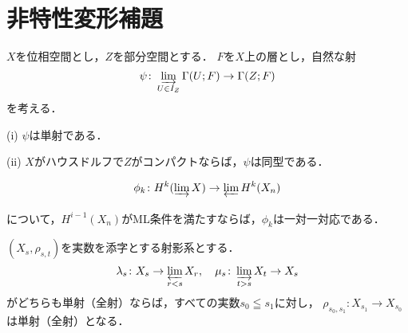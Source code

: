 \section{非特性変形補題}
\begin{leftbar}
\begin{PRP}[{\cite[Prop. 2.5.1]{KS90}}]\label{PRP2.5.1}
    \(X\)を位相空間とし，\(Z\)を部分空間とする．
    \(F\)を\(X\)上の層とし，自然な射
    \[
        \psi\colon\indlim[U\in I_Z]\Gamma(U;F)\to\Gamma(Z;F)
    \]を考える．

    (i) 
    \(\psi\)は単射である．

    (ii)
    \(X\)がハウスドルフで\(Z\)がコンパクトならば，\(\psi\)は同型である．
\end{PRP}
\end{leftbar}
\begin{leftbar}
    \begin{PRP}[{\cite[Prop. 1.12.4]{KS90}}]\label{PRP1.12.4}
        \[
            \phi_k\colon H^k(\indlim X)\to\prolim H^k(X_n)
        \]
        について，\(H^{i-1}(X_n)\)がML条件を満たすならば，\(\phi_k\)は一対一対応である．
    \end{PRP}
\end{leftbar}
    
\begin{leftbar}
\begin{PRP}[{\cite[Prop. 1.12.6]{KS90}}]\label{PRP1.12.6}
    \((X_s,\rho_{s,t})\)を実数を添字とする射影系とする．
    \[
        \lambda_s\colon X_s\to\prolim[r<s]X_r,
        \quad
        \mu_s\colon\indlim[t>s]X_t\to X_s
    \]
    がどちらも単射（全射）ならば，すべての実数\(s_0\leqq s_1\)に対し，
    \(\rho_{s_0,s_1}\colon X_{s_1}\to X_{s_0}\)は単射（全射）となる．
\end{PRP}
\end{leftbar}

